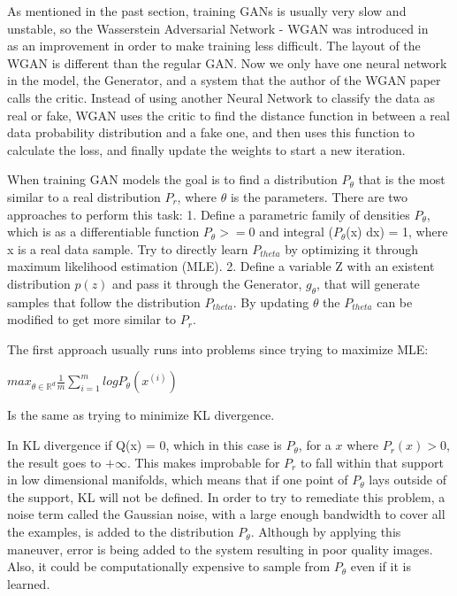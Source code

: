 
As mentioned in the past section, training GANs is usually very slow and unstable, so the Wasserstein Adversarial Network - WGAN was introduced in ~\cite{Arjovsky2017} as an improvement in order to make training less difficult. The layout of the WGAN is different than the regular GAN. Now we only have one neural network in the model, the Generator, and a system that the author of the WGAN paper calls the critic. Instead of using another Neural Network to classify the data as real or fake, WGAN uses the critic to find the distance function in between a real data probability distribution and a fake one, and then uses this function to calculate the loss, and finally update the weights to start a new iteration.

When training GAN models the goal is to find a distribution $P_{\theta}$ that is the most similar to a real distribution $P_{r}$, where $\theta$ is the parameters. There are two approaches to perform this task:
1. Define a parametric family of densities $P_{\theta}$, which is as a differentiable function $P_{\theta} >= 0$ and integral ($P_{\theta}$(x) dx) = 1, where x is a real data sample. Try to directly learn $P_{theta}$ by optimizing it through maximum likelihood estimation (MLE).
2. Define a variable Z with an existent distribution $p(z)$ and pass it through the Generator, $g_{\theta}$, that will generate samples that follow the distribution $P_{theta}$. By updating $\theta$ the $P_{theta}$ can be modified to get more similar to $P_{r}$.

The first approach usually runs into problems since trying to maximize MLE:
\begin{center}
	$max_{\theta\in \mathbb{R}^{d}} \frac{1}{m} \sum_{i=1}^{m} log P_{\theta}(x^{(i)})$
\end{center}

Is the same as trying to minimize KL divergence.


In KL divergence if Q(x) = 0, which in this case is $P_{\theta}$, for a $x$ where $P_{r}(x) > 0$, the result goes to $+\infty$. This makes improbable for $P_{r}$ to fall within that support in low dimensional manifolds, which means that if one point of $P_{\theta}$ lays outside of the support, KL will not be defined. In order to try to remediate this problem, a noise term called the Gaussian noise, with a large enough bandwidth to cover all the examples, is added to the distribution $P_{\theta}$. Although by applying this maneuver, error is being added to the system resulting in poor quality images. Also, it could be computationally expensive to sample from $P_{\theta}$ even if it is learned.

